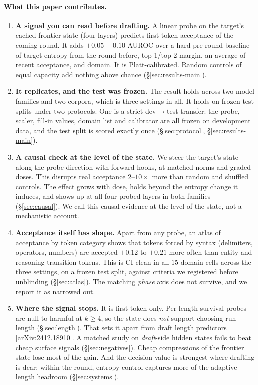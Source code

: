 \documentclass[11pt]{article}
\begin{document}
\paragraph{What this paper contributes.}
\begin{enumerate}
\item \textbf{A signal you can read before drafting.} A linear probe on the
target's cached frontier state (four layers) predicts first-token acceptance of
the coming round. It adds $+0.05$--$+0.10$ AUROC over a hard pre-round baseline
of target entropy from the round before, top-1/top-2 margin, an average of
recent acceptance, and domain. It is Platt-calibrated. Random controls of equal
capacity add nothing above chance (\S\ref{sec:results-main}).
\item \textbf{It replicates, and the test was frozen.} The result holds across
two model families and two corpora, which is three settings in all. It holds on
frozen test splits under two protocols. One is a strict dev$\to$test transfer:
the probe, scaler, fill-in values, domain list and calibrator are all frozen on
development data, and the test split is scored exactly once
(\S\ref{sec:protocol}, \S\ref{sec:results-main}).
\item \textbf{A causal check at the level of the state.} We steer the target's
state along the probe direction with forward hooks, at matched norms and graded
doses. This disrupts real acceptance $2$--$10\times$ more than random and
shuffled controls. The effect grows with dose, holds beyond the entropy change
it induces, and shows up at all four probed layers in both families
(\S\ref{sec:causal}). We call this causal evidence at the level of the state,
not a mechanistic account.
\item \textbf{Acceptance itself has shape.} Apart from any probe, an atlas of
acceptance by token category shows that tokens forced by syntax (delimiters,
operators, numbers) are accepted $+0.12$ to $+0.21$ more often than entity and
reasoning-transition tokens. This is CI-clean in all $15$ domain cells across
the three settings, on a frozen test split, against criteria we registered
before unblinding (\S\ref{sec:atlas}). The matching \emph{phase} axis does not
survive, and we report it as narrowed out.
\item \textbf{Where the signal stops.} It is first-token only. Per-length
survival probes are null to harmful at $k\ge4$, so the state does \emph{not}
support choosing run length (\S\ref{sec:length}). That sets it apart from draft
length predictors [arXiv:2412.18910]. A matched study on \emph{draft}-side
hidden states fails to beat cheap surface signals (\S\ref{sec:negatives}).
Cheap compressions of the frontier state lose most of the gain. And the
decision value is strongest where drafting is dear; within the round, entropy
control captures more of the adaptive-length headroom (\S\ref{sec:systems}).
\end{enumerate}
\end{document}
